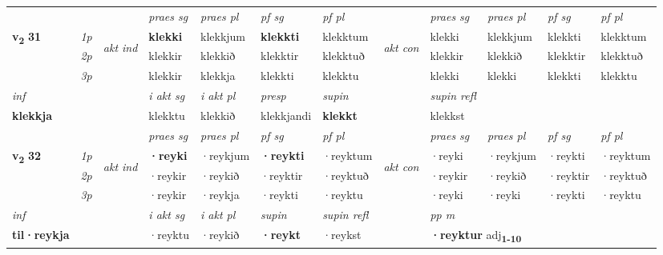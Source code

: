 \begin{longtable}[l]{X>{\footnotesize\itshape}llXXXXlXXXX}
 & &   & \textit{praes sg}  & \textit{praes pl}    & \textit{ pf sg} & \textit{pf pl} & & \textit{praes sg}  & \textit{praes pl}    & \textit{pf sg} & \textit{pf pl }  \\ \cmidrule{4-7} \cmidrule{9-12}
 \multirow{2}{*}{{{\textbf{v{\textsubscript{2}}} \Large{\textbf{31}}}}}  & 1p & \multirow{3}{*}{\begin{turn}{90}\textit{akt ind}\end{turn}} & \textbf{klekki} & klekkjum & \textbf{klekkti} & klekktum & \multirow{3}{*}{\begin{turn}{90}\textit{akt con}\end{turn}} &klekki & klekkjum & klekkti & klekktum\\*
 & 2p &  &  klekkir  & klekkið & klekktir & klekktuð & & klekkir & klekkið & klekktir & klekktuð \\*
 & 3p &  & klekkir & klekkja & klekkti & klekktu & & klekki & klekki& klekkti & klekktu \\*
\cmidrule{4-7} \cmidrule{9-12}

   {\textit{inf}} & &  & \textit{i akt sg} & \textit{i akt pl}   & \textit{presp} & \textit{supin} && \textit{supin refl}  \\*
  {\textbf{klekkja}} & && klekktu  & klekkið   & klekkjandi &  \textbf{klekkt} && klekkst  \\*

\midrule

 & &   & \textit{praes sg}  & \textit{praes pl}    & \textit{ pf sg} & \textit{pf pl} & & \textit{praes sg}  & \textit{praes pl}    & \textit{pf sg} & \textit{pf pl }  \\ \cmidrule{4-7} \cmidrule{9-12}
 \multirow{2}{*}{{{\textbf{v{\textsubscript{2}}} \Large{\textbf{32}}}}}  & 1p & \multirow{3}{*}{\begin{turn}{90}\textit{akt ind}\end{turn}} & \textbf{·reyki} & ·reykjum & \textbf{·reykti} & ·reyktum & \multirow{3}{*}{\begin{turn}{90}\textit{akt con}\end{turn}} &·reyki & ·reykjum & ·reykti & ·reyktum\\*
 & 2p &  &  ·reykir  & ·reykið & ·reyktir & ·reyktuð & & ·reykir & ·reykið & ·reyktir & ·reyktuð \\*
 & 3p &  & ·reykir & ·reykja & ·reykti & ·reyktu & & ·reyki & ·reyki& ·reykti & ·reyktu \\*
\cmidrule{4-7} \cmidrule{9-12}

   {\textit{inf}} & &  & \textit{i akt sg} & \textit{i akt pl}    & \textit{supin} & \textit{supin refl} && \textit{pp m} \\*
  {\textbf{til\allowbreak ·reykja}} & && ·reyktu  & ·reykið    &  \textbf{·reykt} & ·reykst && \multicolumn{2}{l}{\textbf{·reyktur} adj\textbf{\textsubscript{1-10}}} \\*


\end{longtable}
